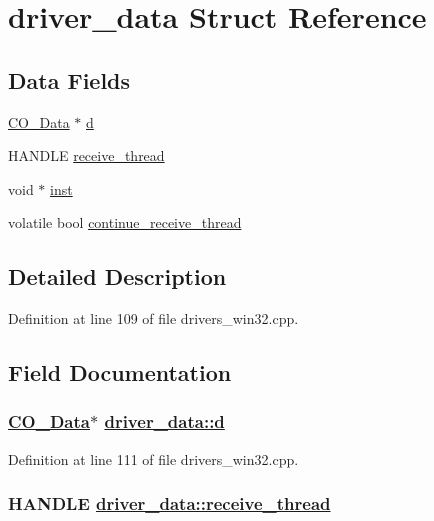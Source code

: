 \hypertarget{structdriver__data}{
\section{driver\_\-data Struct Reference}
\label{structdriver__data}
}
\subsection*{Data Fields}
\begin{CompactItemize}
\item 
\hyperlink{structstruct__CO__Data}{CO\_\-Data} $\ast$ \hyperlink{structdriver__data_31be9af5c9b281de5159adc80b24b12f}{d}
\item 
HANDLE \hyperlink{structdriver__data_ddfb0d0f3be07196b47e118feff22575}{receive\_\-thread}
\item 
void $\ast$ \hyperlink{structdriver__data_7b72c29b808518f746698a7530e699db}{inst}
\item 
volatile bool \hyperlink{structdriver__data_58870858d50af0a8e0fc198a0fd54a42}{continue\_\-receive\_\-thread}
\end{CompactItemize}


\subsection{Detailed Description}




Definition at line 109 of file drivers\_\-win32.cpp.

\subsection{Field Documentation}
\hypertarget{structdriver__data_31be9af5c9b281de5159adc80b24b12f}{
\subsubsection[d]{\setlength{\rightskip}{0pt plus 5cm}\hyperlink{structstruct__CO__Data}{CO\_\-Data}$\ast$ \hyperlink{structdriver__data_31be9af5c9b281de5159adc80b24b12f}{driver\_\-data::d}}}
\label{structdriver__data_31be9af5c9b281de5159adc80b24b12f}




Definition at line 111 of file drivers\_\-win32.cpp.\hypertarget{structdriver__data_ddfb0d0f3be07196b47e118feff22575}{
\subsubsection[receive\_\-thread]{\setlength{\rightskip}{0pt plus 5cm}HANDLE \hyperlink{structdriver__data_ddfb0d0f3be07196b47e118feff22575}{driver\_\-data::receive\_\-thread}}}
\label{structdriver__data_ddfb0d0f3be07196b47e118feff22575}




